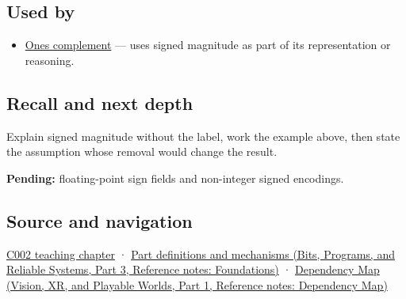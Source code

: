 \subsection{Used by}\label{appendix-ce20506c8532-used-by}

\hypertarget{appendix-ce20506c8532-used-by}{}

\begin{itemize}
\tightlist
\item
  \hyperref[appendix-03c678cd40b3]{One\textquotesingle s complement} --- uses signed magnitude as part of its representation or reasoning.
\end{itemize}

\subsection{Recall and next depth}\label{appendix-ce20506c8532-recall-and-next-depth}

\hypertarget{appendix-ce20506c8532-recall-and-next-depth}{}

Explain signed magnitude without the label, work the example above, then state the assumption whose removal would change the result.

\textbf{Pending:} floating-point sign fields and non-integer signed encodings.

\subsection{Source and navigation}\label{appendix-ce20506c8532-source-and-navigation}

\hypertarget{appendix-ce20506c8532-source-and-navigation}{}

\hyperref[01-foundations-i-ch001-arithmetic-becomes-a-policy]{C002 teaching chapter} · \href{../01-Bits-Programs-and-Reliable-Systems-P03/main.pdf\#nameddest=appendix-fd090d982a15}{Part definitions and mechanisms (Bits, Programs, and Reliable Systems, Part 3, Reference notes: Foundations)} · \href{../07-Vision-XR-and-Playable-Worlds-P01/main.pdf\#nameddest=appendix-4ad47bdd269a}{Dependency Map (Vision, XR, and Playable Worlds, Part 1, Reference notes: Dependency Map)}
